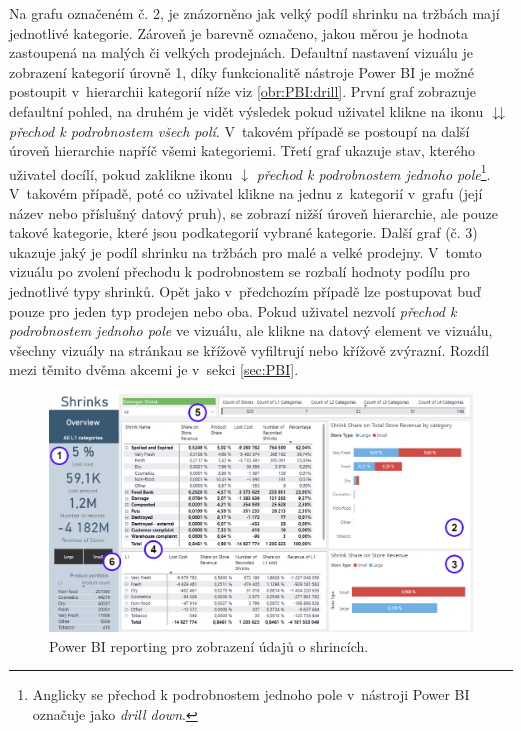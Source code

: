 Na grafu označeném č. 2, je znázorněno jak velký podíl shrinku na tržbách mají jednotlivé kategorie. Zároveň je barevně označeno, jakou měrou je hodnota zastoupená na malých či velkých prodejnách. Defaultní nastavení vizuálu je zobrazení kategorií úrovně 1, díky funkcionalitě nástroje Power BI je možné postoupit v~hierarchii kategorií níže viz \ref*{obr:PBI:drill}. První graf zobrazuje defaultní pohled, na druhém je vidět výsledek pokud uživatel klikne na ikonu $\downdownarrows$ \emph{přechod k podrobnostem všech polí}. V~takovém případě se postoupí na další úroveň hierarchie napříč všemi kategoriemi. Třetí graf ukazuje stav, kterého uživatel docílí, pokud zaklikne ikonu $\downarrow$ \emph{přechod k podrobnostem jednoho pole}\footnote{Anglicky se přechod k podrobnostem jednoho pole v~nástroji Power BI označuje jako \emph{drill down}.}. V~takovém případě, poté co uživatel klikne na jednu z~kategorií v~grafu (její název nebo příslušný datový pruh), se zobrazí nižší úroveň hierarchie, ale pouze takové kategorie, které jsou podkategorií vybrané kategorie. 
Další graf (č. 3) ukazuje jaký je podíl shrinku na tržbách pro malé a velké prodejny. V~tomto vizuálu po zvolení přechodu k podrobnostem se rozbalí hodnoty podílu pro jednotlivé typy shrinků. Opět jako v~předchozím případě lze postupovat buď pouze pro jeden typ prodejen nebo oba.
Pokud uživatel nezvolí \emph{přechod k podrobnostem jednoho pole} ve vizuálu, ale klikne na datový element ve vizuálu, všechny vizuály na stránkau se křížově vyfiltrují nebo křížově zvýrazní. Rozdíl mezi těmito dvěma akcemi je v~sekci \ref*{sec:PBI}. 
\begin{figure}[h!]
    \centering
    \captionsetup{justification=centering}
    \includegraphics[width=\textwidth]{obrazky/PBI/overview.png}
    \caption{Power BI reporting pro zobrazení údajů o shrincích.}
    \label{obr:PBI:overview}
\end{figure}

